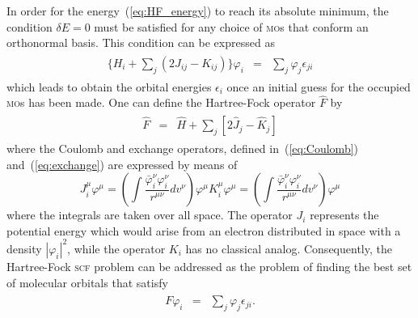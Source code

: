 In order for the energy~(\ref{eq:HF_energy}) to reach its absolute
minimum, the condition $\delta E = 0$ must be satisfied for any choice
of \textsc{mo}s that conform an orthonormal basis. This condition can
be expressed as~\cite{Roothaan_HF,Levine_QChem}
%
\begin{eqnarray}
  \begin{split}
    \{H_{i} + \sum\limits_{j} ( 2J_{ij} - K_{ij} ) \} \varphi_{i} & = &
    \sum\limits_{j} \varphi_{j} \epsilon_{ji}
  \end{split}
\label{eq:deltaEzero}
\end{eqnarray}
%
which leads to obtain the orbital energies $\epsilon_{i}$ once an
initial guess for the occupied \textsc{mo}s has been made. One can
define the Hartree-Fock operator $\hat{F}$ by
%
\begin{eqnarray}
  \begin{split}
    \hat{F} & = & \hat{H} +
    \sum\limits_{j} [ 2\hat{J}_{j} - \hat{K}_{j} ]
  \end{split}
  \label{eq:F_operator}
\end{eqnarray}
%
where the Coulomb and exchange operators, defined
in~(\ref{eq:Coulomb}) and~(\ref{eq:exchange}) are expressed by means of
%
\begin{subequations}
  \begin{equation}\label{eq:one_indxJ}
    J_{i}^{\mu} \varphi^{\mu} = \left( \int
    \frac{\bar\varphi_{i}^{\nu} \varphi_{i}^{\nu}}
         {r^{\mu\nu}} dv^{\nu}
         \right) \varphi^{\mu}
  \end{equation}
  \begin{equation}\label{eq:one_indxK}
    K_{i}^{\mu} \varphi^{\mu} = \left( \int
    \frac{\bar\varphi_{i}^{\nu} \varphi_{i}^{\nu}}
         {r^{\mu\nu}} dv^{\nu}
         \right) \varphi^{\mu}
  \end{equation}
\end{subequations}
%
where the integrals are taken over all space. The operator $J_{i}$
represents the potential energy which would arise from an electron
distributed in space with a density $|\varphi_{i}|^{2}$, while the
operator $K_{i}$ has no classical analog. Consequently, the
Hartree-Fock \textsc{scf} problem can be addressed as the problem of
finding the best set of molecular orbitals that
satisfy~\cite{Roothaan_HF,Levine_QChem}
%
\begin{eqnarray}
  \begin{split}
    F \varphi_{i} & = & \sum\limits_{j} \varphi_{j} \epsilon_{ji}.
  \end{split}
  \label{eq:Fock_operator_problem}
\end{eqnarray}
%


